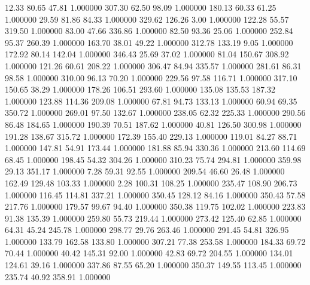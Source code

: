      12.33     80.65     47.81  1.000000
    307.30     62.50     98.09  1.000000
    180.13     60.33     61.25  1.000000
     29.59     81.86     84.33  1.000000
    329.62    126.26      3.00  1.000000
    122.28     55.57    319.50  1.000000
     83.00     47.66    336.86  1.000000
     82.50     93.36     25.06  1.000000
    252.84     95.37    260.39  1.000000
    163.70     38.01     49.22  1.000000
    312.78    133.19      9.05  1.000000
    172.92     80.14    142.04  1.000000
    346.43     25.69     37.02  1.000000
     81.04    150.67    308.92  1.000000
    121.26     60.61    208.22  1.000000
    306.47     84.94    335.57  1.000000
    281.61     86.31     98.58  1.000000
    310.00     96.13     70.20  1.000000
    229.56     97.58    116.71  1.000000
    317.10    150.65     38.29  1.000000
    178.26    106.51    293.60  1.000000
    135.08    135.53    187.32  1.000000
    123.88    114.36    209.08  1.000000
     67.81     94.73    133.13  1.000000
     60.94     69.35    350.72  1.000000
    269.01     97.50    132.67  1.000000
    238.05     62.32    225.33  1.000000
    290.56     86.48    184.65  1.000000
    190.39     70.51    187.62  1.000000
     40.81    126.50    300.98  1.000000
    191.28    138.67    315.72  1.000000
    172.39    155.40    229.13  1.000000
    119.01     84.27     88.71  1.000000
    147.81     54.91    173.44  1.000000
    181.88     85.94    330.36  1.000000
    213.60    114.69     68.45  1.000000
    198.45     54.32    304.26  1.000000
    310.23     75.74    294.81  1.000000
    359.98     29.13    351.17  1.000000
      7.28     59.31     92.55  1.000000
    209.54     46.60     26.48  1.000000
    162.49    129.48    103.33  1.000000
      2.28    100.31    108.25  1.000000
    235.47    108.90    206.73  1.000000
    116.45    114.81    337.21  1.000000
    350.45    128.12     84.16  1.000000
    350.43     57.58    217.76  1.000000
    179.57     99.67     94.40  1.000000
    350.38    119.75    102.02  1.000000
    223.83     91.38    135.39  1.000000
    259.80     55.73    219.44  1.000000
    273.42    125.40     62.85  1.000000
     64.31     45.24    245.78  1.000000
    298.77     29.76    263.46  1.000000
    291.45     54.81    326.95  1.000000
    133.79    162.58    133.80  1.000000
    307.21     77.38    253.58  1.000000
    184.33     69.72     70.44  1.000000
     40.42    145.31     92.00  1.000000
     42.83     69.72    204.55  1.000000
    134.01    124.61     39.16  1.000000
    337.86     87.55     65.20  1.000000
    350.37    149.55    113.45  1.000000
    235.74     40.92    358.91  1.000000
